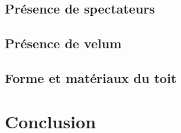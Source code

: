 		\section{Présence de spectateurs}
		\section{Présence de velum}
		\section{Forme et matériaux du toit}
		
		\newpage
		
	\chapter*{Conclusion}
	
		\newpage
		
 
 
